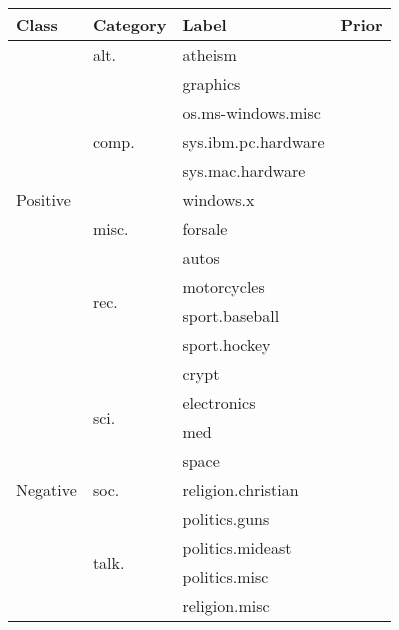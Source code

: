 \begin{tabular}{@{}llll@{}}
  \toprule
  Class                      & Category & Label        & Prior \\\midrule
  \multirow{11}{*}{Positive} & alt.     & atheism      & \\\cline{2-4}
  & \multirow{5}{*}{comp.} & graphics            & \\
  & & os.ms-windows.misc  & \\
  & & sys.ibm.pc.hardware & \\
  & & sys.mac.hardware    & \\
  & & windows.x           & \\\cline{2-4}
  & misc.  & forsale     & \\\cline{2-4}
  &\multirow{4}{*}{rec.} & autos & \\
  & & motorcycles    & \\
  & & sport.baseball & \\
  & & sport.hockey   & \\\hline
  \multirow{9}{*}{Negative} & \multirow{4}{*}{sci.} & crypt & \\
  & & electronics & \\
  & & med          & \\
  & & space        & \\\cline{2-4}
  & soc.  & religion.christian & \\\cline{2-4}
  & \multirow{4}{*}{talk.} & politics.guns & \\
  & & politics.mideast & \\
  & & politics.misc    & \\
  & & religion.misc    & \\
  \bottomrule
\end{tabular}
